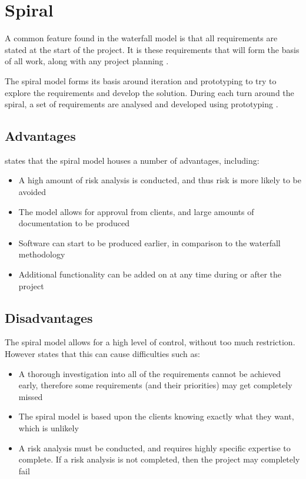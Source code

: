 \section{Spiral}

A common feature found in the waterfall model is that all requirements are 
stated at the start of the project. It is these requirements that will form the
basis of all work, along with any project planning \citep{cadle10}.

The spiral model forms its basis around iteration and prototyping to try to 
explore the requirements and develop the solution. During each turn around the
spiral, a set of requirements are analysed and developed using prototyping 
\citep{cadle10}.


\subsection{Advantages}
\citet{cadle10} states that the spiral model houses a number of advantages, 
including:

\begin{itemize}
  \item A high amount of risk analysis is conducted, and thus risk is more 
  likely to be avoided
  \item The model allows for approval from clients, and large amounts of 
  documentation to be produced
  \item Software can start to be produced earlier, in comparison to the 
  waterfall methodology
  \item Additional functionality can be added on at any time during or after 
  the project
\end{itemize}


\subsection{Disadvantages}
The spiral model allows for a high level of control, without too much 
restriction. However \citet{cadle10} states that this can cause difficulties 
such as:

\begin{itemize}
  \item A thorough investigation into all of the requirements cannot be 
  achieved early, therefore some requirements (and their priorities) may get 
  completely missed
  \item The spiral model is based upon the clients knowing exactly what they 
  want, which is unlikely
  \item A risk analysis must be conducted, and requires highly specific 
  expertise to complete. If a risk analysis is not completed, then the project
  may completely fail 
\end{itemize}
